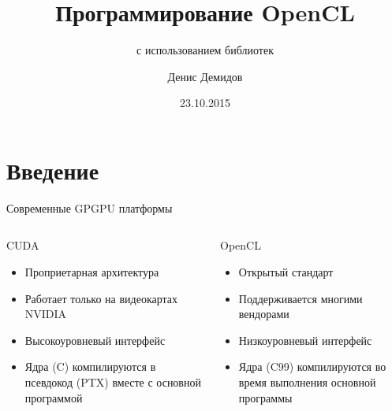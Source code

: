 \documentclass[@BEAMER_OPTIONS@]{beamer}
\title{Программирование OpenCL}
\subtitle{с использованием библиотек \CXX}
\author{Денис Демидов}
\institute{Институт системных исследований РАН\\
    Казанский Федеральный Университет}
\date{23.10.2015}
\newcommand{\CXX}{{\rm C}\plusplus}
\newcommand{\CC}{{\rm C99}\xspace}
\begin{document}
\begin{frame}{}
    \titlepage
\end{frame}

\note{ }

\section{Введение}

\begin{frame}{Современные GPGPU платформы}
    \begin{columns}
        \begin{column}{0.45\textwidth}
            \begin{block}{CUDA}
                \begin{itemize}
                    \item Проприетарная архитектура
                    \item Работает только на видеокартах NVIDIA
                    \item Высокоуровневый интерфейс
                    \item Ядра (\CXX) компилируются в псевдокод (PTX) вместе с
                        основной программой
                \end{itemize}
            \end{block}
        \end{column}
        \begin{column}{0.45\textwidth}
            \begin{block}{OpenCL}
                \begin{itemize}
                    \item Открытый стандарт
                    \item Поддерживается многими вендорами
                    \item Низкоуровневый интерфейс
                    \item Ядра (\CC) компилируются во время выполнения основной
                        программы
                \end{itemize}
            \end{block}
        \end{column}
    \end{columns}
\end{frame}
\end{document}
